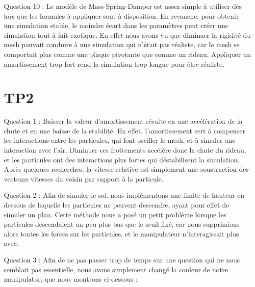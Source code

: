 \documentclass[a4paper,12pt]{article}
\begin{document}
Question 10 : Le modèle de Mass-Spring-Damper est assez simple à utiliser dès lors que les formules à appliquer sont à disposition. En revanche, pour obtenir une simulation stable, le moindre écart dans les paramètres peut créer une simulation tout à fait exotique. En effet nous avons vu que diminuer la rigidité du mesh pouvait conduire à une simulation qui n'était pas réaliste, car le mesh se comportait plus comme une plaque pivotante que comme un rideau. Appliquer un amortissement trop fort rend la simulation trop longue pour être réaliste.

\section{TP2}

Question 1 : Baisser la valeur d'amortissement résulte en une accélération de la chute et en une baisse de la stabilité. En effet, l'amortissement sert à compenser les interactions entre les particules, qui font osciller le mesh, et à simuler une interaction avec l'air. Diminuer ces \og{}frottements\fg{} accélère donc la chute du rideau, et les particules ont des interactions plus fortes qui déstabilisent la simulation. Après quelques recherches, la vitesse relative est simplement une soustraction des vecteurs vitesses du voisin par rapport à la particule.

Question 2 : Afin de simuler le sol, nous implémentons une limite de hauteur en dessous de laquelle les particules ne peuvent descendre, ayant pour effet de simuler un plan. Cette méthode nous a posé un petit problème lorsque les particules descendaient un peu plus bas que le seuil fixé, car nous supprimions alors toutes les forces sur les particules, et le manipulateur n’interagissait plus avec.


Question 3 : Afin de ne pas passer trop de temps sur une question qui ne nous semblait pas essentielle, nous avons simplement changé la couleur de notre manipulator, que nous montrons ci-dessous : %
\end{document}
